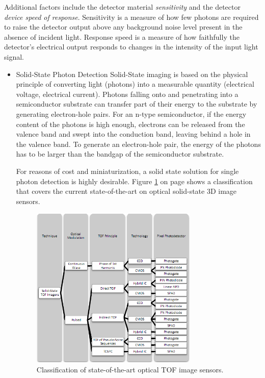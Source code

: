 Additional factors include the detector material \textit{sensitivity} and the detector \textit{device speed of response}. Sensitivity is a measure of how few photons are required to raise the detector output above any background noise level present in the absence of incident light. Response speed is a measure of how faithfully the detector's electrical output responds to changes in the intensity of the input light signal.
\begin{itemize}
	\item Solid-State Photon Detection
Solid-State imaging is based on the physical principle of converting light (photons) into a measurable quantity (electrical voltage, electrical current). Photons falling onto and penetrating into a semiconductor substrate can transfer part of their energy to the substrate by generating electron-hole pairs. For an n-type semiconductor, if the energy content of the photons is high enough, electrons can be released from the valence band and swept into the conduction band, leaving behind a hole in the valence band. To generate an electron-hole pair, the energy of the photons has to be larger than the bandgap of the semiconductor substrate.\cite{photogrammetry}

For reasons of cost and miniaturization, a solid state solution for single photon detection is highly desirable. Figure \ref{fig:intro_receiver1} on page \pageref{fig:intro_receiver1} shows a classification that covers the current state-of-the-art on optical solid-state 3D image sensors. 

\begin{figure}[ht!]
\centering
\includegraphics[width=0.75\textwidth]{chapters/img/intro_receiver1.png}
\caption{Classification of state-of-the-art optical \ac{TOF} image sensors.}
\label{fig:intro_receiver1}
\end{figure}


\end{itemize}
